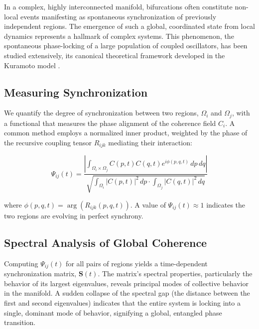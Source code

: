 In a complex, highly interconnected manifold, bifurcations often constitute non-local events manifesting as spontaneous synchronization of previously independent regions. The emergence of such a global, coordinated state from local dynamics represents a hallmark of complex systems. This phenomenon, the spontaneous phase-locking of a large population of coupled oscillators, has been studied extensively, its canonical theoretical framework developed in the Kuramoto model \autocite{Kuramoto1975}.


\subsection{Measuring Synchronization}
\label{11.4.1:measuring_synchronization}

We quantify the degree of synchronization between two regions, \(\Omega_i\) and \(\Omega_j\), with a functional that measures the phase alignment of the coherence field \(C_i\). A common method employs a normalized inner product, weighted by the phase of the recursive coupling tensor \(R_{ijk}\) mediating their interaction:

\begin{equation}
\Psi_{ij}(t) = \frac{\left|\int_{\Omega_i \times \Omega_j} C(p,t)C(q,t)e^{i\phi(p,q,t)} \, dp \, dq\right|}{\sqrt{\int_{\Omega_i} |C(p,t)|^2 \, dp \cdot \int_{\Omega_j} |C(q,t)|^2 \, dq}}
\end{equation}

where \(\phi(p,q,t) = \arg(R_{ijk}(p,q,t))\). A value of \(\Psi_{ij}(t) \approx 1\) indicates the two regions are evolving in perfect synchrony.


\subsection{Spectral Analysis of Global Coherence}
\label{11.4.2:spectral_analysis_of_global_coherence}

Computing \(\Psi_{ij}(t)\) for all pairs of regions yields a time-dependent synchronization matrix, \(\mathbf{S}(t)\). The matrix's spectral properties, particularly the behavior of its largest eigenvalues, reveals principal modes of collective behavior in the manifold. A sudden collapse of the spectral gap (the distance between the first and second eigenvalues) indicates that the entire system is locking into a single, dominant mode of behavior, signifying a global, entangled phase transition. 